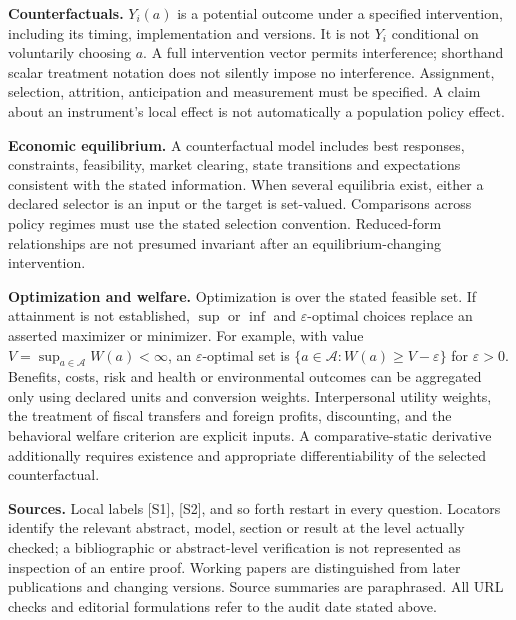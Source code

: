 \documentclass[11pt,a4paper]{article}
\begin{document}
\textbf{Counterfactuals.} $Y_i(a)$ is a potential outcome under a specified intervention, including its timing, implementation and versions. It is not $Y_i$ conditional on voluntarily choosing $a$. A full intervention vector permits interference; shorthand scalar treatment notation does not silently impose no interference. Assignment, selection, attrition, anticipation and measurement must be specified. A claim about an instrument's local effect is not automatically a population policy effect.

\textbf{Economic equilibrium.} A counterfactual model includes best responses, constraints, feasibility, market clearing, state transitions and expectations consistent with the stated information. When several equilibria exist, either a declared selector is an input or the target is set-valued. Comparisons across policy regimes must use the stated selection convention. Reduced-form relationships are not presumed invariant after an equilibrium-changing intervention.

\textbf{Optimization and welfare.} Optimization is over the stated feasible set. If attainment is not established, $\sup$ or $\inf$ and $\varepsilon$-optimal choices replace an asserted maximizer or minimizer. For example, with value $V=\sup_{a\in\mathcal A}W(a)<\infty$, an $\varepsilon$-optimal set is $\{a\in\mathcal A:W(a)\geq V-\varepsilon\}$ for $\varepsilon>0$. Benefits, costs, risk and health or environmental outcomes can be aggregated only using declared units and conversion weights. Interpersonal utility weights, the treatment of fiscal transfers and foreign profits, discounting, and the behavioral welfare criterion are explicit inputs. A comparative-static derivative additionally requires existence and appropriate differentiability of the selected counterfactual.

\textbf{Sources.} Local labels [S1], [S2], and so forth restart in every question. Locators identify the relevant abstract, model, section or result at the level actually checked; a bibliographic or abstract-level verification is not represented as inspection of an entire proof. Working papers are distinguished from later publications and changing versions. Source summaries are paraphrased. All URL checks and editorial formulations refer to the audit date stated above.
\end{document}
